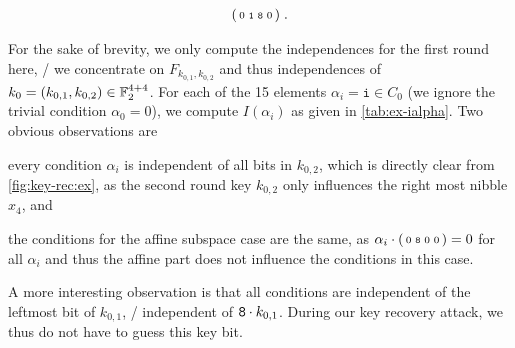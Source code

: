 \begin{example}
\begin{description}
\begin{align*}
                \begin{psmallmatrix} 0 & \mathtt{1} & \mathtt{8} & 0 \end{psmallmatrix}\;.
            \end{align*}
        \item[Step~4] For the sake of brevity, we only compute the independences for the first round here, \ie/ we concentrate on $F_{k_{0,1},k_{0,2}}$ and thus independences of $k_0 = (k_{0,1}, k_{0,2}) \in \mathbb{F}_2^{4+4}$.
            For each of the 15 elements $\alpha_i = \mathtt{i} \in C_0$ (we ignore the trivial condition $\alpha_0 = 0$), we compute $I(\alpha_i)$ as given in \cref{tab:ex-ialpha}.
            Two obvious observations are \begin{inparaenum}
            \item every condition $\alpha_i$ is independent of all bits in $k_{0,2}$, which is directly clear from \cref{fig:key-rec:ex}, as the second round key $k_{0,2}$ only influences the right most nibble $x_4$, and
            \item the conditions for the affine subspace case are the same, as $\alpha_i \cdot \begin{psmallmatrix} 0 & \mathtt{8} & 0 & 0 \end{psmallmatrix} = 0$ for all $\alpha_i$ and thus the affine part does not influence the conditions in this case.
            \end{inparaenum}

            A more interesting observation is that all conditions are independent of the leftmost bit of $k_{0,1}$, \ie/ independent of $\mathtt{8} \cdot k_{0,1}$.
            During our key recovery attack, we thus do not have to guess this key bit.
    \end{description}
\end{example}
